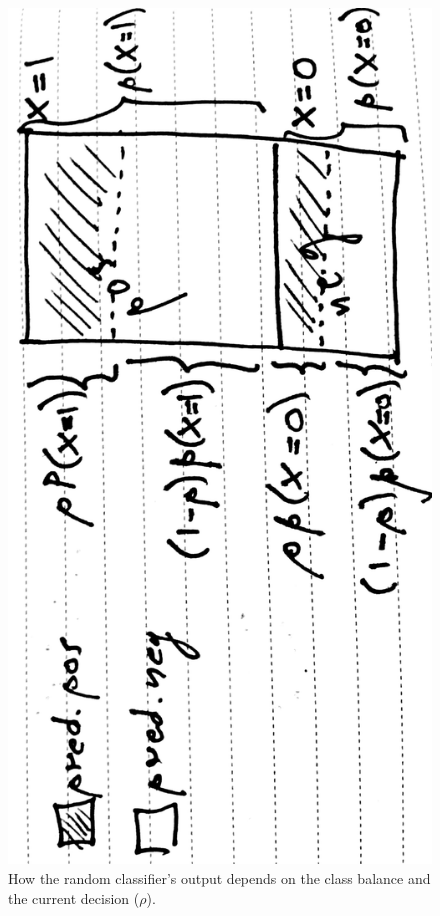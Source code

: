 \documentclass[a4paper]{article}
\begin{document}
\begin{figure}[H]
    \centering
    \includegraphics[scale=.07,angle=-90]{img/unbalanced_dataset.jpg}
    \caption{How the random classifier's output depends on the class balance and the current decision ($\rho$).}
    \label{fig:unlanced_datasets}
\end{figure}
\end{document}
